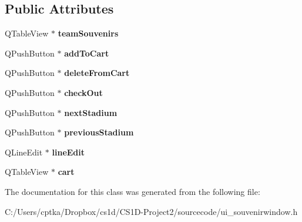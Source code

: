 \subsection*{Public Attributes}
\begin{DoxyCompactItemize}
\item 
\mbox{\label{class_ui__souvenirwindow_a0a03a332bb6550a7cdc5fefd483e04a8}} 
Q\+Table\+View $\ast$ {\bfseries team\+Souvenirs}
\item 
\mbox{\label{class_ui__souvenirwindow_a92ed126080d735b2ab09afc2d1317675}} 
Q\+Push\+Button $\ast$ {\bfseries add\+To\+Cart}
\item 
\mbox{\label{class_ui__souvenirwindow_ad04c75fcbfb4af4b88d3372b6a689096}} 
Q\+Push\+Button $\ast$ {\bfseries delete\+From\+Cart}
\item 
\mbox{\label{class_ui__souvenirwindow_a70915bec2014b44fe5e95e5b885d2988}} 
Q\+Push\+Button $\ast$ {\bfseries check\+Out}
\item 
\mbox{\label{class_ui__souvenirwindow_a588d0ebe241c4fd3e4cfbd9c91844c18}} 
Q\+Push\+Button $\ast$ {\bfseries next\+Stadium}
\item 
\mbox{\label{class_ui__souvenirwindow_a77986242f1e0c215330925dff9d667f6}} 
Q\+Push\+Button $\ast$ {\bfseries previous\+Stadium}
\item 
\mbox{\label{class_ui__souvenirwindow_a6f60487b3b43549c3eba3c97500f5641}} 
Q\+Line\+Edit $\ast$ {\bfseries line\+Edit}
\item 
\mbox{\label{class_ui__souvenirwindow_a541815c951b9d4c62347ef1f18fb1277}} 
Q\+Table\+View $\ast$ {\bfseries cart}
\end{DoxyCompactItemize}


The documentation for this class was generated from the following file\+:\begin{DoxyCompactItemize}
\item 
C\+:/\+Users/cptka/\+Dropbox/cs1d/\+C\+S1\+D-\/\+Project2/sourcecode/ui\+\_\+souvenirwindow.\+h\end{DoxyCompactItemize}
